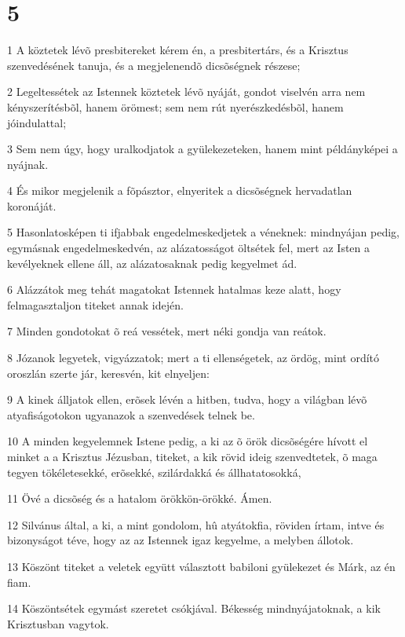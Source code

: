 \chapter{5}

\par 1 A köztetek lévõ presbitereket kérem én, a presbitertárs, és a Krisztus szenvedésének tanuja, és a megjelenendõ dicsõségnek részese;
\par 2 Legeltessétek az Istennek köztetek lévõ nyáját, gondot viselvén arra nem kényszerítésbõl, hanem örömest; sem nem rút nyerészkedésbõl, hanem jóindulattal;
\par 3 Sem nem úgy, hogy uralkodjatok a gyülekezeteken, hanem mint példányképei a nyájnak.
\par 4 És mikor megjelenik a fõpásztor, elnyeritek a dicsõségnek hervadatlan koronáját.
\par 5 Hasonlatosképen ti ifjabbak engedelmeskedjetek a véneknek: mindnyájan pedig, egymásnak engedelmeskedvén, az alázatosságot öltsétek fel, mert az Isten a kevélyeknek ellene áll, az alázatosaknak pedig kegyelmet ád.
\par 6 Alázzátok meg tehát magatokat Istennek hatalmas keze alatt, hogy felmagasztaljon titeket annak idején.
\par 7 Minden gondotokat õ reá vessétek, mert néki gondja van reátok.
\par 8 Józanok legyetek, vigyázzatok; mert a ti ellenségetek, az ördög, mint ordító oroszlán szerte jár, keresvén, kit elnyeljen:
\par 9 A kinek álljatok ellen, erõsek lévén a hitben, tudva, hogy a világban lévõ atyafiságotokon ugyanazok a szenvedések telnek be.
\par 10 A minden kegyelemnek Istene pedig, a ki az õ örök dicsõségére hívott el minket a a Krisztus Jézusban, titeket, a kik rövid ideig szenvedtetek, õ maga tegyen tökéletesekké, erõsekké, szilárdakká és állhatatosokká,
\par 11 Övé a dicsõség és a hatalom örökkön-örökké. Ámen.
\par 12 Silvánus által, a ki, a mint gondolom, hû atyátokfia, röviden írtam, intve és bizonyságot téve, hogy az az Istennek igaz kegyelme, a melyben állotok.
\par 13 Köszönt titeket a veletek együtt választott babiloni gyülekezet és Márk, az én fiam.
\par 14 Köszöntsétek egymást szeretet csókjával. Békesség mindnyájatoknak, a kik Krisztusban vagytok.


